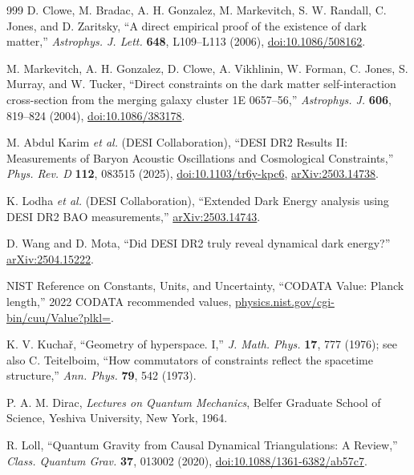 \documentclass[aps,prd,reprint,nofootinbib,superscriptaddress,floatfix]{revtex4-2}
\numberwithin{equation}{section}
\theoremstyle{definition}
\theoremstyle{plain}
\begin{document}
\begin{thebibliography}{999}
D. Clowe, M. Bradac, A. H. Gonzalez, M. Markevitch, S. W. Randall, C. Jones, and D. Zaritsky,
``A direct empirical proof of the existence of dark matter,''
\emph{Astrophys. J. Lett.} \textbf{648}, L109--L113 (2006),
\href{https://doi.org/10.1086/508162}{doi:10.1086/508162}.

M. Markevitch, A. H. Gonzalez, D. Clowe, A. Vikhlinin, W. Forman, C. Jones, S. Murray, and W. Tucker,
``Direct constraints on the dark matter self-interaction cross-section from the merging galaxy cluster 1E 0657--56,''
\emph{Astrophys. J.} \textbf{606}, 819--824 (2004),
\href{https://doi.org/10.1086/383178}{doi:10.1086/383178}.


M. Abdul Karim \emph{et al.} (DESI Collaboration),
``DESI DR2 Results II: Measurements of Baryon Acoustic Oscillations and Cosmological Constraints,''
\emph{Phys. Rev. D} \textbf{112}, 083515 (2025),
\href{https://doi.org/10.1103/tr6y-kpc6}{doi:10.1103/tr6y-kpc6},
\href{https://arxiv.org/abs/2503.14738}{arXiv:2503.14738}.

K. Lodha \emph{et al.} (DESI Collaboration),
``Extended Dark Energy analysis using DESI DR2 BAO measurements,''
\href{https://arxiv.org/abs/2503.14743}{arXiv:2503.14743}.

D. Wang and D. Mota,
``Did DESI DR2 truly reveal dynamical dark energy?''
\href{https://arxiv.org/abs/2504.15222}{arXiv:2504.15222}.

NIST Reference on Constants, Units, and Uncertainty,
``CODATA Value: Planck length,''
2022 CODATA recommended values,
\href{https://physics.nist.gov/cgi-bin/cuu/Value?plkl=}{physics.nist.gov/cgi-bin/cuu/Value?plkl=}.



K. V. Kucha\v{r}, ``Geometry of hyperspace. I,''
\emph{J. Math. Phys.} \textbf{17}, 777 (1976);
see also C. Teitelboim, ``How commutators of constraints reflect the spacetime structure,''
\emph{Ann. Phys.} \textbf{79}, 542 (1973).

P. A. M. Dirac, \emph{Lectures on Quantum Mechanics}, Belfer Graduate School of Science, Yeshiva University, New York, 1964.

R. Loll, ``Quantum Gravity from Causal Dynamical Triangulations: A Review,''
\emph{Class. Quantum Grav.} \textbf{37}, 013002 (2020),
\href{https://doi.org/10.1088/1361-6382/ab57c7}{doi:10.1088/1361-6382/ab57c7}.


\end{thebibliography}
\end{document}
